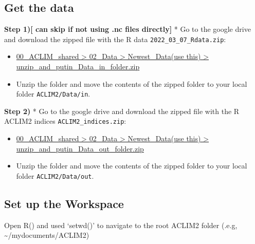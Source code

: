 \documentclass[
]{article}
\begin{document}
\hypertarget{get-the-data}{%
\subsection{Get the data}\label{get-the-data}}

\textbf{Step 1){[} can skip if not using .nc files directly{]} } * Go to
the google drive and download the zipped file with the R data
\texttt{2022\_03\_07\_Rdata.zip}:

\begin{itemize}
\item
  \href{https://drive.google.com/drive/folders/11BQEfNEl9vvrN-V0LgS67XS4aLE9pNzz}{00\_ACLIM\_shared
  \textgreater{} 02\_Data \textgreater{} Newest\_Data(use this)
  \textgreater{} unzip\_and\_putin\_Data\_in\_folder.zip}
\item
  Unzip the folder and move the contents of the zipped folder to your
  local folder \texttt{ACLIM2/Data/in}.
\end{itemize}

\textbf{Step 2)} * Go to the google drive and download the zipped file
with the R ACLIM2 indices \texttt{ACLIM2\_indices.zip}:

\begin{itemize}
\item
  \href{https://drive.google.com/drive/folders/11BQEfNEl9vvrN-V0LgS67XS4aLE9pNzz}{00\_ACLIM\_shared
  \textgreater{} 02\_Data \textgreater{} Newest\_Data(use this)
  \textgreater{} unzip\_and\_putin\_Data\_out\_folder.zip}
\item
  Unzip the folder and move the contents of the zipped folder to your
  local folder \texttt{ACLIM2/Data/out}.
\end{itemize}

\hypertarget{set-up-the-workspace}{%
\subsection{Set up the Workspace}\label{set-up-the-workspace}}

Open R() and used `setwd()' to navigate to the root ACLIM2 folder (.e.g,
\textasciitilde/mydocuments/ACLIM2)
\end{document}
